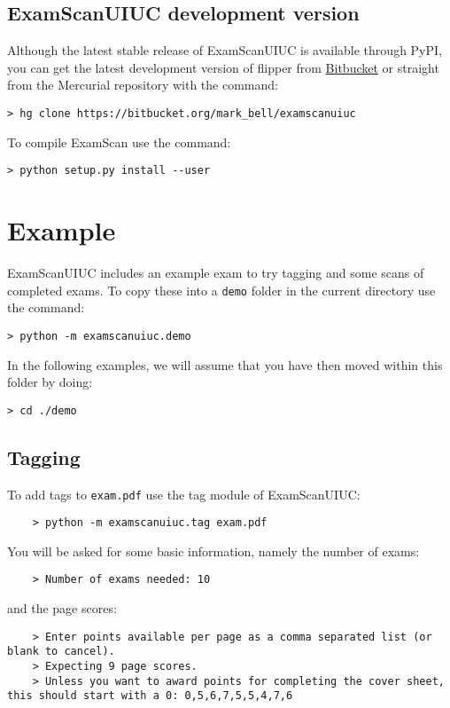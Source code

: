 \documentclass[a4paper]{article}
\begin{document}
\subsection{ExamScanUIUC development version}

Although the latest stable release of ExamScanUIUC is available through PyPI, you can get the latest development version of flipper from \href{https://bitbucket.org/mark_bell/examscanuiuc}{Bitbucket} or straight from the Mercurial repository with the command:
\begin{lstlisting}
> hg clone https://bitbucket.org/mark_bell/examscanuiuc
\end{lstlisting}
To compile ExamScan use the command:
\begin{lstlisting}
> python setup.py install --user
\end{lstlisting}

\section{Example}

ExamScanUIUC includes an example exam to try tagging and some scans of completed exams.
To copy these into a \texttt{demo} folder in the current directory use the command:

\begin{lstlisting}
> python -m examscanuiuc.demo
\end{lstlisting}

In the following examples, we will assume that you have then moved within this folder by doing:
\begin{lstlisting}
> cd ./demo
\end{lstlisting}

\subsection{Tagging}

To add tags to \texttt{exam.pdf} use the tag module of ExamScanUIUC:
\begin{lstlisting}
	> python -m examscanuiuc.tag exam.pdf
\end{lstlisting}

You will be asked for some basic information, namely the number of exams:
\begin{lstlisting}
	> Number of exams needed: 10
\end{lstlisting}

and the page scores:
\begin{lstlisting}
	> Enter points available per page as a comma separated list (or blank to cancel).
	> Expecting 9 page scores.
	> Unless you want to award points for completing the cover sheet, this should start with a 0: 0,5,6,7,5,5,4,7,6
\end{lstlisting}
\end{document}
